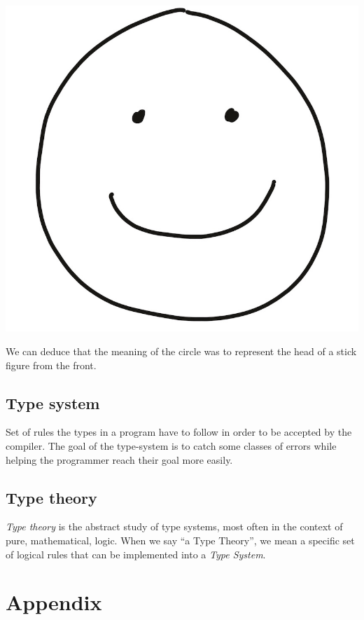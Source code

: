 \documentclass[
]{article}
\begin{document}
\includegraphics{Smiley smol.jpeg}

We can deduce that the meaning of the circle was to represent the head
of a stick figure from the front.

\hypertarget{type-system-1}{%
\subsection{Type system}\label{type-system-1}}

Set of rules the types in a program have to follow in order to be
accepted by the compiler. The goal of the type-system is to catch some
classes of errors while helping the programmer reach their goal more
easily.

\hypertarget{type-theory}{%
\subsection{Type theory}\label{type-theory}}

\emph{Type theory} is the abstract study of type systems, most often in
the context of pure, mathematical, logic. When we say ``a Type Theory'',
we mean a specific set of logical rules that can be implemented into a
\emph{Type System}.

 


\hypertarget{appendix}{%
\section{Appendix}\label{appendix}}
\end{document}

